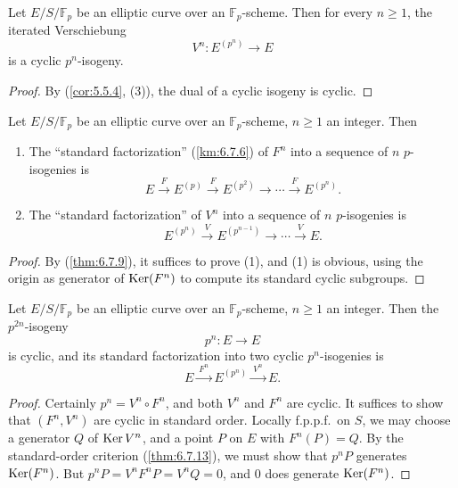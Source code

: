 \begin{klem}\label{lem:12.2.3}
Let $E/S/\mathbb{F}_p$ be an elliptic curve over an $\mathbb{F}_p$-scheme. Then for every $n \ge 1$, the iterated Verschiebung
\[
V^n : E^{(p^n)} \to E
\]
is a cyclic $p^n$-isogeny.
\end{klem}

\begin{proof}
By (\ref{cor:5.5.4}, (3)), the dual of a cyclic isogeny is cyclic.
\end{proof}

\begin{klem}\label{lem:12.2.4}
Let $E/S/\mathbb{F}_p$ be an elliptic curve over an $\mathbb{F}_p$-scheme, $n \ge 1$ an integer. Then
\begin{enumerate}[label=(\arabic*)]
\item The ``standard factorization'' (\ref{km:6.7.6}) of $F^n$ into a sequence of $n$ $p$-isogenies is
\[
E \xrightarrow{\ F\ } E^{(p)} \xrightarrow{\ F\ } E^{(p^2)} \xrightarrow{\quad} \cdots \xrightarrow{\ F\ } E^{(p^n)} .
\]
\item The ``standard factorization'' of $V^n$ into a sequence of $n$ $p$-isogenies is
\[
E^{(p^n)} \xrightarrow{\ V\ } E^{(p^{n-1})} \xrightarrow{\quad} \cdots \xrightarrow{\ V\ } E .
\]
\end{enumerate}
\end{klem}

\begin{proof}
By (\ref{thm:6.7.9}), it suffices to prove (1), and (1) is obvious, using the origin as generator of $\operatorname{Ker}(F^n)$ to compute its standard cyclic subgroups.
\end{proof}

\begin{klem}\label{lem:12.2.5}
Let $E/S/\mathbb{F}_p$ be an elliptic curve over an $\mathbb{F}_p$-scheme, $n \ge 1$ an integer. Then the $p^{2n}$-isogeny
\[
p^n : E \to E
\]
is cyclic, and its standard factorization into two cyclic $p^n$-isogenies is
\[
E \xrightarrow{\ F^n\ } E^{(p^n)} \xrightarrow{\ V^n\ } E .
\]
\end{klem}

\begin{proof}
Certainly $p^n = V^n \circ F^n$, and both $V^n$ and $F^n$ are cyclic. It suffices to show that $(F^n, V^n)$ are cyclic in standard order. Locally f.p.p.f.\ on $S$, we may choose a generator $Q$ of $\operatorname{Ker} V^n$, and a point $P$ on $E$ with $F^n(P) = Q$. By the standard-order criterion (\ref{thm:6.7.13}), we must show that $p^n P$ generates $\operatorname{Ker}(F^n)$. But $p^n P = V^n F^n P = V^n Q = 0$, and $0$ does generate $\operatorname{Ker}(F^n)$.
\end{proof}

